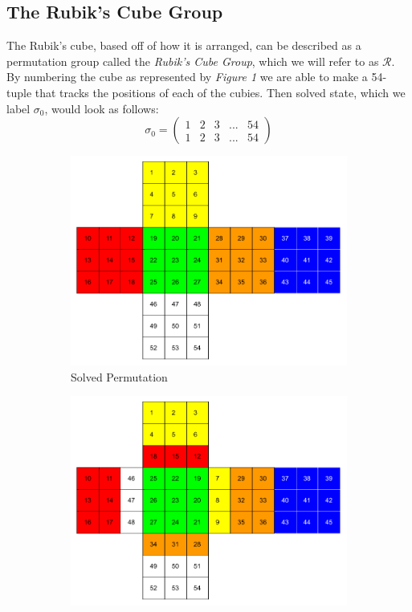 \documentclass{article}
\begin{document}
\subsection{The Rubik's Cube Group}
The Rubik's cube, based off of how it is arranged, can be described as a permutation group called the \emph{Rubik's Cube Group}, which we will refer to as $\mathcal{R}$.  By numbering the cube as represented by \textit{Figure 1} we are able to make a 54-tuple that tracks the positions of each of the cubies. Then solved state, which we label $\sigma_0$, would look as follows: 
$$\sigma_0 = \begin{pmatrix}
                1 & 2 & 3 & ... & 54\\
                1 & 2 & 3 & ... & 54
             \end{pmatrix}$$
\begin{figure}[ht]
    \centering
    \begin{subfigure}[b]{0.5\textwidth}
        \centering
        \includegraphics[scale=0.2]{images/Cube_Numbering.png}
        \caption{Solved Permutation}
        \label{fig:solved permutation}
    \end{subfigure}
    \hfill
    \begin{subfigure}[b]{0.5\textwidth}
        \centering
        \includegraphics[scale=0.2]{images/Cube_Numbering_Front.png}

\end{subfigure}
\end{figure}
\end{document}
